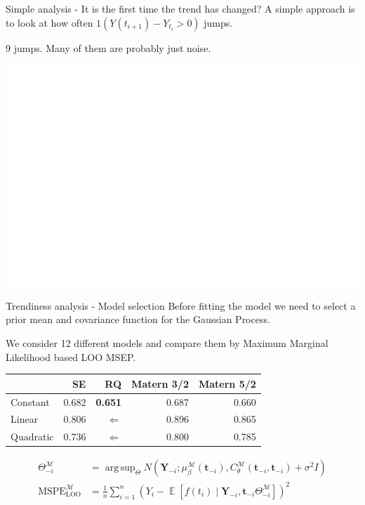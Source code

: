 \documentclass[ignorenonframetext,xcolor=pdflatex,table,dvipsnames,serif]{beamer}
\DeclareMathOperator{\E}{\mathbb{E}}
\DeclareMathOperator*{\argsup}{arg\,sup}
\begin{document}
\begin{frame}{Simple analysis - It is the first time the trend has changed?}
A simple approach is to look at how often $1(Y(t_{i+1}) - Y_{t_i} > 0)$ jumps. 

9 jumps. Many of them are probably just noise.

\center\includegraphics[scale=0.45]{jumpPlot}
\end{frame}


\begin{frame}{Trendiness analysis - Model selection}
Before fitting the model we need to select a prior mean and covariance function for the Gaussian Process. 

\vspace{0.6cm}

We consider 12 different models and compare them by Maximum Marginal Likelihood based LOO MSEP.

\begin{table}[htbp]
\center
\begin{tabular}{l|rrrr}
 & SE & RQ & Matern 3/2 & Matern 5/2\\ \hline
Constant & 0.682 & \textbf{0.651} & 0.687 & 0.660\\
Linear & 0.806 & $\Leftarrow	$ & 0.896 & 0.865\\
Quadratic & 0.736 & $\Leftarrow$ & 0.800 & 0.785
\end{tabular}
\end{table}

\begin{align*}
  \Theta_{-i}^\mathcal{M} &= \argsup_{\Theta} N\left(\mathbf{Y}_{-i}; \mu_\beta^\mathcal{M}(\mathbf{t}_{-i}), C_\theta^\mathcal{M}(\mathbf{t}_{-i}, \mathbf{t}_{-i}) + \sigma^2 I\right)\\
  \text{MSPE}_{\text{LOO}}^\mathcal{M} &= \frac{1}{n}\sum_{i=1}^{n} \left(Y_i - \E[f(t_i) \mid \mathbf{Y}_{-i}, \mathbf{t}_{-i} \Theta_{-i}^\mathcal{M}]\right)^2
\end{align*}
\end{frame}
\end{document}
